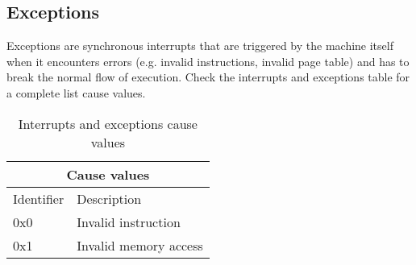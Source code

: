 \documentclass{article}
\begin{document}
\subsection{Exceptions}
Exceptions are synchronous interrupts that are triggered by the machine itself when it encounters errors (e.g. invalid instructions, invalid page table) and has to break the normal flow of execution. Check the interrupts and exceptions table for a complete list cause values.
\\

\begin{table}[h!]
\centering
\begin{tabular} { | p{6cm} | p{6cm} |}
  \hline
  \multicolumn{2}{|c|}{Cause values}\\
  \hline
  Identifier & Description\\
  \hline  
  0x0 & Invalid instruction\\
  0x1 & Invalid memory access \\
  
  \hline
  
\end{tabular}

\caption{Interrupts and exceptions cause values}
\end{table}
\end{document}
